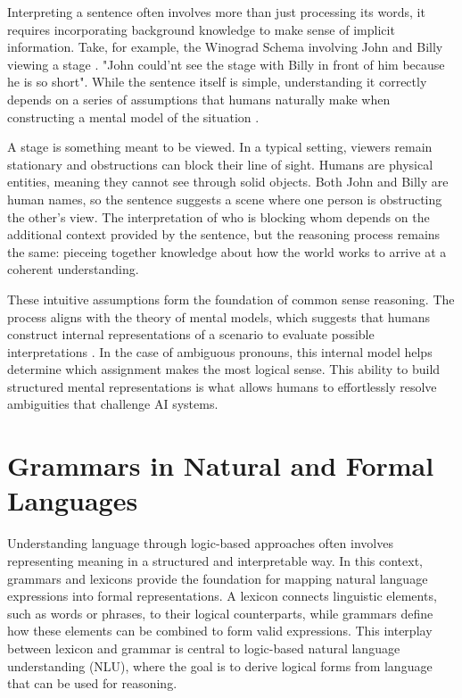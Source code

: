 \documentclass[english,version-2020-11]{uzl-thesis}
\begin{document}
Interpreting a sentence often involves more than just processing its words, it requires incorporating background knowledge to make sense of implicit information. Take, for example, the Winograd Schema involving John and Billy viewing a stage \cite{Levesque2012}. 
"John could'nt see the stage with Billy in front of him because he is so short".
While the sentence itself is simple, understanding it correctly depends on a series of assumptions that humans naturally make when constructing a mental model of the situation \cite{Bayerkuhnlein2023}.

A stage is something meant to be viewed. In a typical setting, viewers remain stationary and obstructions can block their line of sight. Humans are physical entities, meaning they cannot see through solid objects. Both John and Billy are human names, so the sentence suggests a scene where one person is obstructing the other’s view. The interpretation of who is blocking whom depends on the additional context provided by the sentence, but the reasoning process remains the same: pieceing together knowledge about how the world works to arrive at a coherent understanding.

These intuitive assumptions form the foundation of common sense reasoning. The process aligns with the theory of mental models, which suggests that humans construct internal representations of a scenario to evaluate possible interpretations \cite{JohnsonLaird1989}. In the case of ambiguous pronouns, this internal model helps determine which assignment makes the most logical sense. This ability to build structured mental representations is what allows humans to effortlessly resolve ambiguities that challenge AI systems.

\section{Grammars in Natural and Formal Languages}

Understanding language through logic-based approaches often involves representing meaning in a structured and interpretable way. In this context, grammars and lexicons provide the foundation for mapping natural language expressions into formal representations. A lexicon connects linguistic elements, such as words or phrases, to their logical counterparts, while grammars define how these elements can be combined to form valid expressions. This interplay between lexicon and grammar is central to logic-based natural language understanding (NLU), where the goal is to derive logical forms from language that can be used for reasoning.
\end{document}
